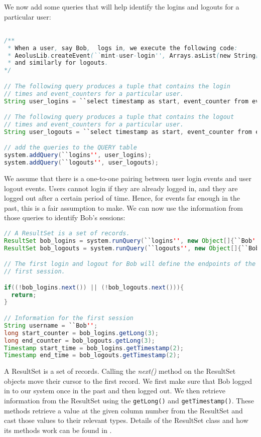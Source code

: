 We now add some queries that will help identify the logins and logouts for a particular user:

\begin{lstlisting}[language=Java]

/**
 * When a user, say Bob,  logs in, we execute the following code:
 * AeolusLib.createEvent(``mint-user-login'', Arrays.asList(new String[]{``Bob''}));
 * and similarly for logouts.
*/

// The following query produces a tuple that contains the login
// times and event_counters for a particular user.
String user_logins = ``select timestamp as start, event_counter from events where app_op='mint-user-login' and app_arg[0]=?'';

// The following query produces a tuple that contains the logout
// times and event_counters for a particular user.
String user_logouts = ``select timestamp as start, event_counter from events where app_op='mint-user-logout' and to_array(app_args)[0]=?'';

// add the queries to the QUERY table
system.addQuery(``logins'', user_logins);
system.addQuery(``logouts'', user_logouts);
\end{lstlisting}

\noindent
We assume that there is a one-to-one pairing between user login events and user logout events. Users cannot login if they are already logged in, and they are logged out after a certain period of time. Hence, for events far enough in the past, this is a fair assumption to make. We can now use the information from those queries to identify Bob's sessions:

\begin{lstlisting}[language=Java]
// A ResultSet is a set of records.
ResultSet bob_logins = system.runQuery(``logins'', new Object[]{``Bob''});
ResultSet bob_logouts = system.runQuery(``logouts'', new Object[]{``Bob''});

// The first login and logout for Bob will define the endpoints of the
// first session.

if((!bob_logins.next()) || (!bob_logouts.next())){
  return;
}

// Information for the first session
String username = ``Bob'';
long start_counter = bob_logins.getLong(3);
long end_counter = bob_logouts.getLong(3);
Timestamp start_time = bob_logins.getTimestamp(2);
Timestamp end_time = bob_logouts.getTimestamp(2);
\end{lstlisting}

\noindent
A ResultSet is a set of records. Calling the \emph{next()} method on the ResultSet objects move their cursor to the first record. We first make sure that Bob logged in to our system once in the past and then logged out. We then retrieve information from the ResultSet using the \lstinline$getLong()$ and \lstinline$getTimestamp()$. These methods retrieve a value at the given column number from the ResultSet and cast those values to their relevant types. Details of the ResultSet class and how its methods work can be found in \cite{jdoc}.


